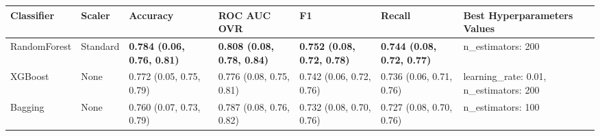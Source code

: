\begin{tabular}{lllllll}
\toprule
Classifier & Scaler & Accuracy & ROC AUC OVR & F1 & Recall & Best Hyperparameters Values \\
\midrule
RandomForest & Standard & \textbf{0.784 (0.06, 0.76, 0.81)} & \textbf{0.808 (0.08, 0.78, 0.84)} & \textbf{0.752 (0.08, 0.72, 0.78)} & \textbf{0.744 (0.08, 0.72, 0.77)} & {{n\_estimators: 200}} \\
XGBoost & None & 0.772 (0.05, 0.75, 0.79) & 0.776 (0.08, 0.75, 0.81) & 0.742 (0.06, 0.72, 0.76) & 0.736 (0.06, 0.71, 0.76) & {{learning\_rate: 0.01, n\_estimators: 200}} \\
Bagging & None & 0.760 (0.07, 0.73, 0.79) & 0.787 (0.08, 0.76, 0.82) & 0.732 (0.08, 0.70, 0.76) & 0.727 (0.08, 0.70, 0.76) & {{n\_estimators: 100}} \\
\bottomrule
\end{tabular}
